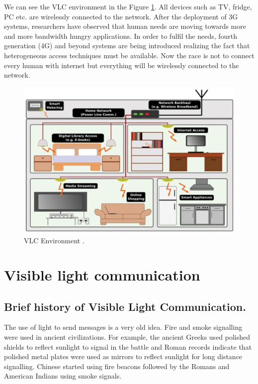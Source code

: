 We can see the VLC environment in the Figure \ref{vlc}. All devices such as TV, fridge, PC etc. are wirelessly connected to the network. After the deployment of 3G systems, researchers have observed that human needs are moving towards more and more bandwidth hungry applications. In order to fulfil the needs, fourth generation (4G) and beyond systems are being introduced realizing the fact that heterogeneous access techniques must be available. Now the race is not to connect every human with internet but everything will be wirelessly connected to the network.

\begin{figure}[h]
\begin{center}
\includegraphics[width=4.5in]{basic1.eps}
\caption{VLC Environment \cite{r19}.} \label{vlc}
\end{center}
\end{figure}

%


\section{Visible light communication}

\subsection {Brief history of Visible Light Communication.}
The use of light to send messages is a very old idea. Fire and smoke signalling were used in ancient civilizations. For example, the ancient Greeks used polished shields to reflect sunlight to signal in the battle and Roman records indicate that polished metal plates were used as mirrors to reflect sunlight for long distance signalling. Chinese started using fire beacons followed by the Romans and American Indians using
smoke signals.

